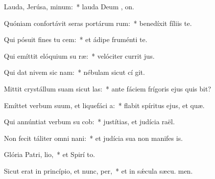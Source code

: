 \item Lauda, Jerúsa, minum:~* lauda Deum , on.
\item Quóniam confortávit seras portárum rum:~* benedíxit fíliis   te.
\item Qui pósuit fines tu cem:~* et ádipe fruménti  te.
\item Qui emíttit elóquium su ræ:~* velóciter currit  jus.
\item Qui dat nivem sic nam:~* nébulam sicut cí git.
\item Mittit crystállum suam sicut las:~* ante fáciem frígoris ejus quis bit?
\item Emíttet verbum suum, et liquefáci a:~* flabit spíritus ejus, et  quæ.
\item Qui annúntiat verbum su cob:~* justítias, et judícia  raël.
\item Non fecit táliter omni nani:~* et judícia sua non manifes is.
\item Glória Patri,  lio,~* et Spirí to.
\item Sicut erat in princípio, et nunc,  per,~* et in sǽcula sæcu. men.
